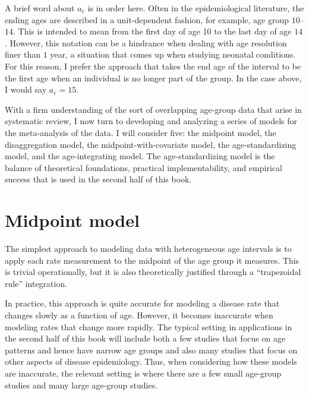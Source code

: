 A brief word about ${a_e}$ is in order here.  Often in the
epidemiological literature, the ending ages are described in a
unit-dependent fashion, for example, age group $10$--$14$.  This is intended
to mean from the first day of age 10 to the last day of age $14$.
However, this notation can be a hindrance when dealing with age
resolution finer than $1$ year, a situation that comes up when studying
neonatal conditions.  For this reason, I prefer the approach that
takes the end age of the interval to be the first age when an
individual is no longer part of the group.  In the case above, I would
say ${a_e} = 15$.


With a firm understanding of the sort of overlapping age-group data
that arise in systematic review, I now turn to developing and
analyzing a series of models for the meta-analysis of the data.
I will consider five: the midpoint model, the disaggregation
model, the midpoint-with-covariate model, the age-standardizing model,
and the age-integrating model.  The age-standardizing model is the
balance of theoretical foundations, practical implementability, and
empirical success that is used in the second half of this
book.

\section{Midpoint model}
\label{theory-age_group_model-mp_model}
The simplest approach to modeling data with heterogeneous age
intervals is to apply each rate measurement to the midpoint of the
age group it measures.  This is trivial operationally, but it is also
theoretically justified through a ``trapezoidal rule'' integration.

In practice, this approach is quite accurate for modeling a
disease rate that changes slowly as a function of age.  However, it
becomes inaccurate when modeling rates that change more
rapidly.  The typical setting in applications in the second half of
this book will include both a few studies that focus on age patterns and
hence have narrow age groups and also many studies
that focus on other aspects of disease epidemiology.  Thus, when
considering how these models are inaccurate, the relevant setting is where
there are a few small age-group studies and many large age-group
studies.

